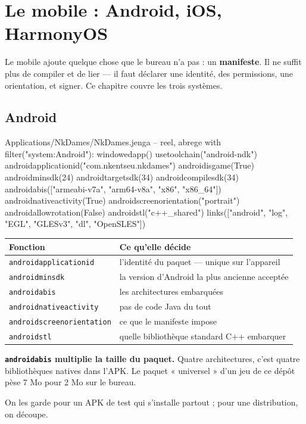\chapter{Le mobile : Android, iOS, HarmonyOS}

Le mobile ajoute quelque chose que le bureau n'a pas : un \textbf{manifeste}. Il
ne suffit plus de compiler et de lier --- il faut déclarer une identité, des
permissions, une orientation, et signer. Ce chapitre couvre les trois systèmes.

\section{Android}

\begin{nkcode}{Applications/NkDames/NkDames.jenga -- reel, abrege}
with filter("system:Android"):
    windowedapp()
    usetoolchain("android-ndk")
    androidapplicationid("com.nkentseu.nkdames")
    androidisgame(True)
    androidminsdk(24)
    androidtargetsdk(34)
    androidcompilesdk(34)
    androidabis(["armeabi-v7a", "arm64-v8a", "x86", "x86_64"])
    androidnativeactivity(True)
    androidscreenorientation("portrait")
    androidallowrotation(False)
    androidstl("c++_shared")
    links(["android", "log", "EGL", "GLESv3", "dl", "OpenSLES"])
\end{nkcode}

\begin{center}
\begin{tabular}{@{}ll@{}}
\toprule
\textbf{Fonction} & \textbf{Ce qu'elle décide} \\
\midrule
\texttt{androidapplicationid} & l'identité du paquet --- unique sur l'appareil \\
\texttt{androidminsdk} & la version d'Android la plus ancienne acceptée \\
\texttt{androidabis} & les architectures embarquées \\
\texttt{androidnativeactivity} & pas de code Java du tout \\
\texttt{androidscreenorientation} & ce que le manifeste impose \\
\texttt{androidstl} & quelle bibliothèque standard C++ embarquer \\
\bottomrule
\end{tabular}
\end{center}

\begin{nkretenir}
\textbf{\texttt{androidabis} multiplie la taille du paquet.} Quatre
architectures, c'est quatre bibliothèques natives dans l'APK. Le paquet
« universel » d'un jeu de ce dépôt pèse 7 Mo pour 2 Mo sur le bureau.

On les garde pour un APK de test qui s'installe partout ; pour une distribution,
on découpe.
\end{nkretenir}

